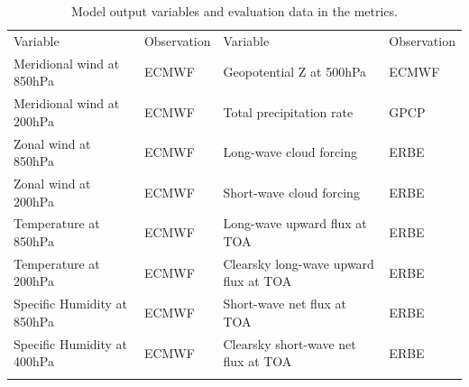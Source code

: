 \documentclass[gmd, manuscript]{copernicus}
\begin{document}
\begin{table}[t]
\caption{Model output variables and evaluation data in the metrics.}
\begin{tabular}{l l l l}
\tophline
Variable & Observation & Variable & Observation \\
\middlehline
Meridional wind at 850hPa   & ECMWF & Geopotential Z at 500hPa              & ECMWF \\
Meridional wind at 200hPa   & ECMWF & Total precipitation rate              & GPCP \\
Zonal wind at 850hPa        & ECMWF & Long-wave cloud forcing                & ERBE \\
Zonal wind at 200hPa        & ECMWF & Short-wave cloud forcing               & ERBE \\
Temperature at 850hPa       & ECMWF & Long-wave upward flux at TOA          & ERBE \\
Temperature at 200hPa       & ECMWF & Clearsky long-wave upward flux at TOA & ERBE \\
Specific Humidity at 850hPa & ECMWF & Short-wave net flux at TOA            & ERBE \\
Specific Humidity at 400hPa & ECMWF & Clearsky short-wave net flux at TOA   & ERBE \\
\bottomhline
\end{tabular}
\belowtable{} %
\end{table}
\end{document}
